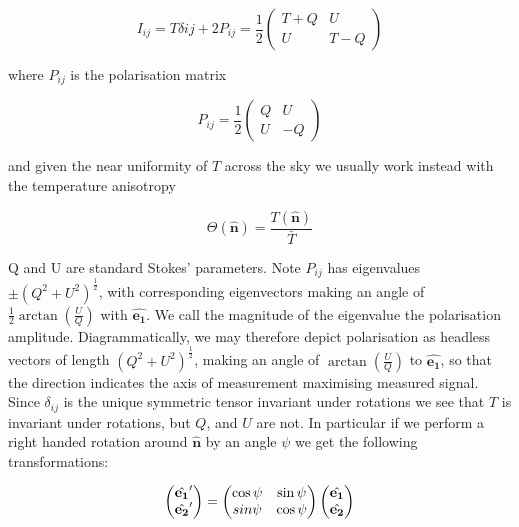\documentclass[a4paper,10pt]{article}
\renewcommand{\v}[1]{\mathbf{#1}}
\newcommand{\half}{\frac{1}{2}}
\newcommand{\unit}[1]{\hat{\v{#1}}}
\begin{document}
\begin{equation}
I_{ij} = T\delta{ij}+2P_{ij}
=\half\begin{pmatrix}
T+Q & U\\ 
U & T-Q
\end{pmatrix}
\end{equation}

where $P_{ij}$ is the polarisation matrix

\begin{equation}
P_{ij} =\half \begin{pmatrix}
Q & U\\ 
U & -Q
\end{pmatrix}
\end{equation}

and given the near uniformity of $T$ across the sky we usually work instead with the temperature anisotropy

\begin{equation}
\Theta(\unit{n}) = \frac{T(\unit{n})}{\bar{T}}
\end{equation}

Q and U are standard Stokes' parameters. Note $P_{ij}$ has eigenvalues $\pm (Q^2 + U^2)^\half$, with corresponding eigenvectors making an angle of $\half\arctan(\frac{U}{Q})$ with $\unit{e_1}$. We call the magnitude of the eigenvalue the polarisation amplitude. Diagrammatically, we may therefore depict polarisation as headless vectors of length $(Q^2 + U^2)^\half$, making an angle of $\arctan(\frac{U}{Q})$ to $\unit{e_1}$, so that the direction indicates the axis of measurement maximising measured signal.\\


Since $\delta_{ij}$ is the unique symmetric tensor invariant under rotations we see that $T$ is invariant under rotations, but $Q$, and $U$ are not. In particular if we perform a right handed rotation around $\unit{n}$ by an angle $\psi$ we get the following transformations:


\begin{equation}
\begin{pmatrix}
\unit{e_1}'\\
\unit{e_2}' 
\end{pmatrix}
=
\begin{pmatrix}
\cos{\psi} & \sin{\psi}\\ 
\-sin{\psi} & \cos{\psi}
\end{pmatrix}
\begin{pmatrix}
\unit{e_1}\\
\unit{e_2} 
\end{pmatrix}
\end{equation}
\end{document}
